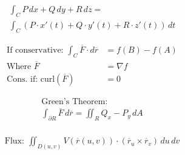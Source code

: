 \documentclass[12pt]{article}
\begin{document}
\vspace{-30pt}

\begin{multicols}{2}

  \begin{equation*}
    \begin{split}
      \int_C P\,dx + Q\,dy + R\,dz =\\
      \int_C (P\cdot x'(t) + Q\cdot y'(t) + R\cdot z'(t))\,dt
    \end{split}
  \end{equation*}

  \begin{equation*}
    \begin{split}
      \text{If conservative: }\int_C \overline{F}\cdot d\overline{r}&=f(B)-f(A)\\
      \text{Where }\overline{F}&=\nabla f\\
      \text{Cons. if: curl}(\overline{F})&=0
    \end{split}
  \end{equation*}

\end{multicols}

\vspace{-30pt}

\begin{multicols}{2}

  \begin{equation*}
    \begin{split}
      \text{Green's Theorem:}\\
      \int_{\partial R}\overline{F}\,d\overline{r}=\iint_R Q_x-P_y\,dA\\
    \end{split}
  \end{equation*}

  \begin{equation*}
    \begin{split}
      \text{Flux: }\iint_{D(u,v)}V(\overline{r}(u,v))\cdot(\overline{r}_u\times\overline{r}_v)\,du\,dv\\
    \end{split}
  \end{equation*}

\end{multicols}

\vspace{-30pt}
\end{document}
